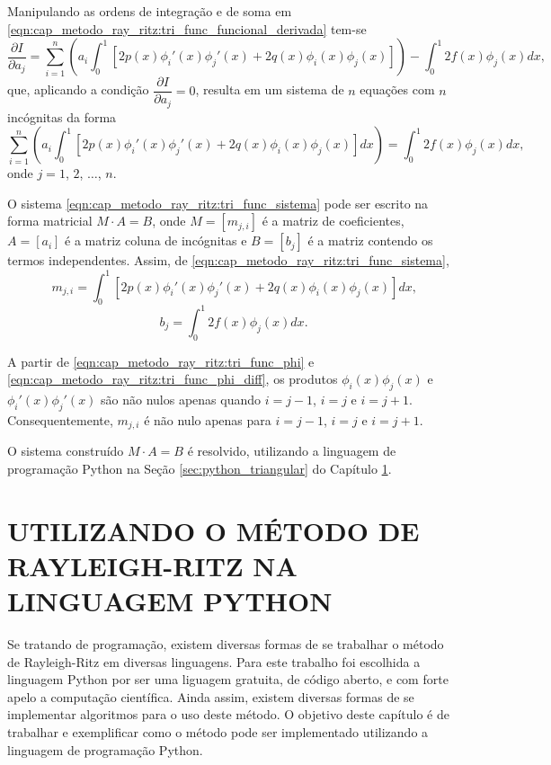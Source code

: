 \documentclass[
	12pt,				%
	openright,			%
    twoside,			%
	a4paper,			%
	english,			%
	french,				%
	spanish,			%
	brazil				%
	]{abntex2}
\numberwithin{lema}{chapter}
\numberwithin{teorema}{chapter}
\numberwithin{definicao}{chapter}
\numberwithin{exemplo}{chapter}
\numberwithin{figure}{chapter}
\begin{document}
Manipulando as ordens de integração e de soma em \eqref{eqn:cap_metodo_ray_ritz:tri_func_funcional_derivada} tem-se
$$
	\frac{\partial I}{\partial a_j} = \sum_{i=1}^{n} \left (
		a_i \int_{0}^{1} \left [
			2p(x)\phi_i'(x)\phi_j'(x)
			+
			2q(x)\phi_i(x)\phi_j(x)
		\right ]
	\right )
	-
	\int_{0}^{1} 2f(x)\phi_j(x)dx
	\text{,}
$$
que, aplicando a condição $\dfrac{\partial I}{\partial a_j}=0$, resulta em um sistema de $n$ equações com $n$ incógnitas da forma
\begin{equation}
	\label{eqn:cap_metodo_ray_ritz:tri_func_sistema}
	\sum_{i=1}^{n} \left (
		a_i \int_{0}^{1} \left [
			2p(x)\phi_i'(x)\phi_j'(x)
			+
			2q(x)\phi_i(x)\phi_j(x)
		\right ] dx
	\right )
	=
	\int_{0}^{1} 2f(x)\phi_j(x)dx
	\text{,}
\end{equation}
onde $j=1$, $2$, $\dots$, $n$.

O sistema \eqref{eqn:cap_metodo_ray_ritz:tri_func_sistema} pode ser escrito na forma matricial $M\cdot A=B$, onde $M=[m_{j, i}]$ é a matriz de coeficientes, $A=[a_i]$ é a matriz coluna de incógnitas e $B=[b_j]$ é a matriz contendo os termos independentes. Assim, de \eqref{eqn:cap_metodo_ray_ritz:tri_func_sistema},
\begin{equation}
	\label{eqn:cap_metodo_ray_ritz:tri_func_mji}
	m_{j,i}=\int_{0}^{1} \left [
		2p(x)\phi_i'(x)\phi_j'(x)
		+
		2q(x)\phi_i(x)\phi_j(x)
	\right ]dx
	\text{,}
\end{equation}
\begin{equation}
	\label{eqn:cap_metodo_ray_ritz:tri_func_bj}
	b_j=\int_{0}^{1} 2f(x)\phi_j(x)dx
	\text{.}
\end{equation}

A partir de \eqref{eqn:cap_metodo_ray_ritz:tri_func_phi} e \eqref{eqn:cap_metodo_ray_ritz:tri_func_phi_diff}, os produtos $\phi_i(x)\phi_j(x)$ e $\phi_i'(x)\phi_j'(x)$ são não nulos apenas quando $i=j-1$, $i=j$ e $i=j+1$. Consequentemente, $m_{j,i}$ é não nulo apenas para $i=j-1$, $i=j$ e $i=j+1$.

O sistema construído $M\cdot A=B$ é resolvido, utilizando a linguagem de programação Python na Seção \ref{sec:python_triangular} do Capítulo \ref{cap:python}.

\chapter{UTILIZANDO O MÉTODO DE RAYLEIGH-RITZ NA LINGUAGEM PYTHON}
\label{cap:python}

Se tratando de programação, existem diversas formas de se trabalhar o método de Rayleigh-Ritz em diversas linguagens. Para este trabalho foi escolhida a linguagem Python por ser uma liguagem gratuita, de código aberto, e com forte apelo a computação científica. Ainda assim, existem diversas formas de se implementar algoritmos para o uso deste método. O objetivo deste capítulo é de trabalhar e exemplificar como o método pode ser implementado utilizando a linguagem de programação Python.
\end{document}
